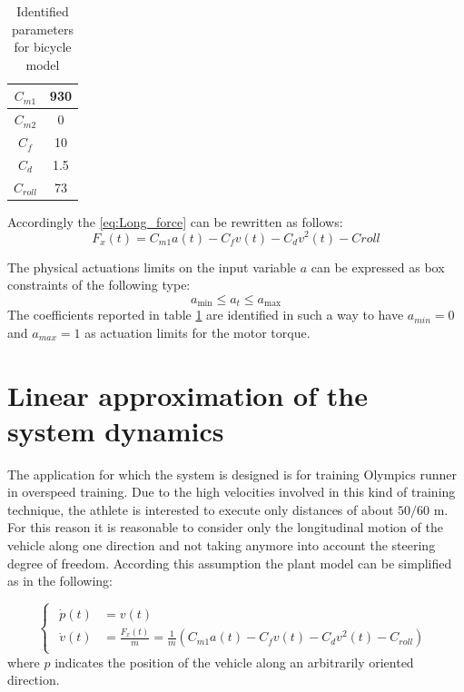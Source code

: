 \documentclass[a4paper,12pt,oneside]{book}
\begin{document}
\begin{table}[h!]
    \centering
    \begin{tabular}{|c|c|}
        \hline
        $C_{m1}$ & 930 \\
        \hline
        $C_{m2}$ & 0 \\
        \hline
        $C_f$ & 10 \\
        \hline
        $C_d$ & 1.5 \\
        \hline
        $C_{roll}$ & 73 \\
        \hline
    \end{tabular}
    \caption{Identified parameters for bicycle model}
    \label{tab:Parameters}
\end{table}

Accordingly the \ref{eq:Long_force} can be rewritten as follows:
\begin{equation}
    F_x(t) = C_{m1} a(t) - C_f v(t) - C_d v^2(t) - Croll
\end{equation}

The physical actuations limits on the input variable $a$ can be expressed as box constraints of the following type:
\begin{equation}
    a_{\text{min}} \leq a_t \leq a_{\text{max}}
\label{Input_limits}
\end{equation}
The coefficients reported in table \ref{tab:Parameters} are identified in such a way to have $a_{min} = 0$ and $a_{max} = 1$ as actuation limits for the motor torque.

\section{Linear approximation of the system dynamics}
The application for which the system is designed is for training Olympics runner in overspeed training. 
Due to the high velocities involved in this kind of training technique, the athlete is interested to execute only distances of about $50/60$ m. 
For this reason it is reasonable to consider only the longitudinal motion of the vehicle along one direction and not taking anymore into account the steering degree of freedom. 
According this assumption the plant model can be simplified as in the following:

\begin{equation}
\begin{cases}
 	\begin{aligned}
		\dot{p}(t) &= v(t) \\
		\dot{v}(t) &= \frac{F_x(t)}{m} = \frac{1}{m} (C_{m1} a(t) - C_f v(t) - C_d v^2(t) - C_{roll} )
	\end{aligned}
\end{cases}
\label{Plant_simplified}
\end{equation}
where $p$ indicates the position of the vehicle along an arbitrarily oriented direction.
\end{document}
